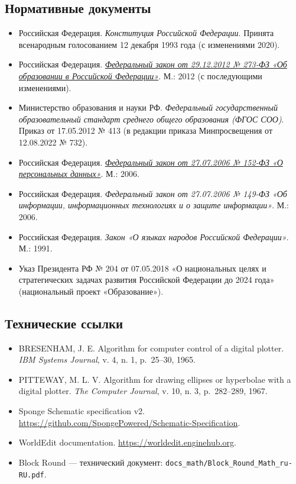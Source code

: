 \documentclass[12pt,a4paper]{scrartcl}
\begin{document}
\subsection{Нормативные документы}
\begin{itemize}[leftmargin=1.3em,itemsep=0.15em,topsep=0.3em]
  \item Российская Федерация. \emph{Конституция Российской Федерации}. Принята всенародным голосованием 12 декабря 1993 года (с изменениями 2020).
  \item Российская Федерация. \href{http://www.consultant.ru/document/cons_doc_LAW_140174/}{\emph{Федеральный закон от 29.12.2012 № 273-ФЗ «Об образовании в Российской Федерации»}}. М.: 2012 (с последующими изменениями).
  \item Министерство образования и науки РФ. \emph{Федеральный государственный образовательный стандарт среднего общего образования (ФГОС СОО)}. Приказ от 17.05.2012 № 413 (в редакции приказа Минпросвещения от 12.08.2022 № 732).
  \item Российская Федерация. \href{http://www.consultant.ru/document/cons_doc_LAW_61801/}{\emph{Федеральный закон от 27.07.2006 № 152-ФЗ «О персональных данных»}}. М.: 2006.
  \item Российская Федерация. \emph{Федеральный закон от 27.07.2006 № 149-ФЗ «Об информации, информационных технологиях и о защите информации»}. М.: 2006.
  \item Российская Федерация. \emph{Закон «О языках народов Российской Федерации»}. М.: 1991.
  \item Указ Президента РФ № 204 от 07.05.2018 «О национальных целях и стратегических задачах развития Российской Федерации до 2024 года» (национальный проект «Образование»).
\end{itemize}

\subsection{Технические ссылки}
\begin{itemize}[leftmargin=1.3em,itemsep=0.15em,topsep=0.3em]
  \item BRESENHAM, J. E. Algorithm for computer control of a digital plotter. \emph{IBM Systems Journal}, v. 4, n. 1, p.~25--30, 1965.
  \item PITTEWAY, M. L. V. Algorithm for drawing ellipses or hyperbolae with a digital plotter. \emph{The Computer Journal}, v. 10, n. 3, p.~282--289, 1967.
  \item Sponge Schematic specification v2. \url{https://github.com/SpongePowered/Schematic-Specification}.
  \item WorldEdit documentation. \url{https://worldedit.enginehub.org}.
  \item Block Round --- технический документ: \texttt{docs\_math/Block\_Round\_Math\_ru-RU.pdf}.
\end{itemize}
\end{document}
